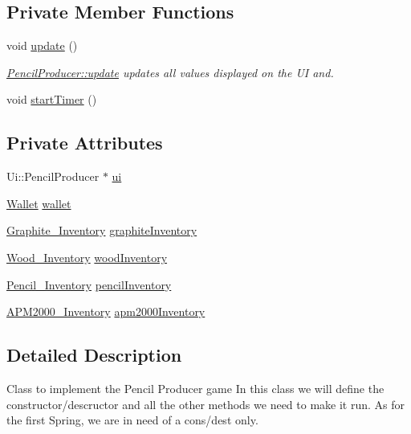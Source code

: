 \subsection*{Private Member Functions}
\begin{DoxyCompactItemize}
\item 
void \hyperlink{classPencilProducer_afcd36c151c55ad1c9024873050eaee4d}{update} ()
\begin{DoxyCompactList}\small\item\em \hyperlink{classPencilProducer_afcd36c151c55ad1c9024873050eaee4d}{Pencil\+Producer\+::update} updates all values displayed on the UI and. \end{DoxyCompactList}\item 
void \hyperlink{classPencilProducer_ae4a56a7023ae3bb0b3f781c3f2a99d7e}{start\+Timer} ()
\end{DoxyCompactItemize}
\subsection*{Private Attributes}
\begin{DoxyCompactItemize}
\item 
Ui\+::\+Pencil\+Producer $\ast$ \hyperlink{classPencilProducer_af8ef000b90959052d1ab135ca9764621}{ui}
\item 
\hyperlink{classWallet}{Wallet} \hyperlink{classPencilProducer_a9ce8a9dbf5deb875692d5dcec4374e2d}{wallet}
\item 
\hyperlink{classGraphite__Inventory}{Graphite\+\_\+\+Inventory} \hyperlink{classPencilProducer_a04a8078a404418407a30a4175aaf890a}{graphite\+Inventory}
\item 
\hyperlink{classWood__Inventory}{Wood\+\_\+\+Inventory} \hyperlink{classPencilProducer_ac0454fe420705b3e3e922661e89ecee0}{wood\+Inventory}
\item 
\hyperlink{classPencil__Inventory}{Pencil\+\_\+\+Inventory} \hyperlink{classPencilProducer_ad1c13392410c1e57b6baff0bfde51e75}{pencil\+Inventory}
\item 
\hyperlink{classAPM2000__Inventory}{A\+P\+M2000\+\_\+\+Inventory} \hyperlink{classPencilProducer_a6af6334d9d18c19f235411a4c5fafb46}{apm2000\+Inventory}
\end{DoxyCompactItemize}


\subsection{Detailed Description}
Class to implement the Pencil Producer game  In this class we will define the constructor/descructor and all the other methods we need to make it run. As for the first Spring, we are in need of a cons/dest only. 

